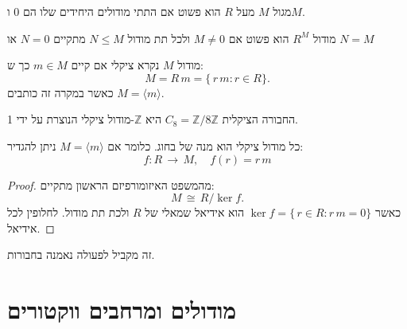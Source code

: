 \documentclass{tstextbook}
\begin{document}
\begin{definition}
מגול \(M\) מעל \(R\) הוא פשוט אם התתי מודולים היחידים שלו הם 0 ו\(M\).

\end{definition}
\begin{proposition}
מודול \(R^{M}\) הוא פשוט אם \(M\neq 0\) ולכל תת מודול \(N\leq M\) מתקיים \(N=0\) או \(N=M\)

\end{proposition}
\begin{definition}
מודול \(M\) נקרא ציקלי אם קיים \(m \in M\) כך ש:
$$M=R\,m=\{\,r\,m:r\in R\}.$$
כאשר במקרה זה כותבים \(M=\langle m \rangle\).

\end{definition}
\begin{example}
החבורה הציקלית \(C_{8}= \mathbb{Z} / 8\mathbb{Z}\) היא \(\mathbb{Z}\)-מודול ציקלי הנוצרת על ידי 1.

\end{example}
\begin{proposition}
כל מודול ציקלי הוא מנה של בחוג. כלומר אם \(M=\langle m \rangle\) ניתן להגדיר:
$$f:R\,\longrightarrow\,M,\quad f(r)=r\,m$$

\end{proposition}
\begin{proof}
מהמשפט האיזומורפיזם הראשון מתקיים:
$$M\,\cong\,R/\ker f.$$
כאשר \(\ker f=\{\,r\in R:r\,m=0\}\) הוא אידיאל שמאלי של \(R\) ולכת תת מודול. לחלופין לכל אידיאל.

\end{proof}
\begin{remark}
זה מקביל לפעולה נאמנה בחבורות.

\end{remark}
\section{מודולים ומרחבים ווקטורים}
\end{document}
